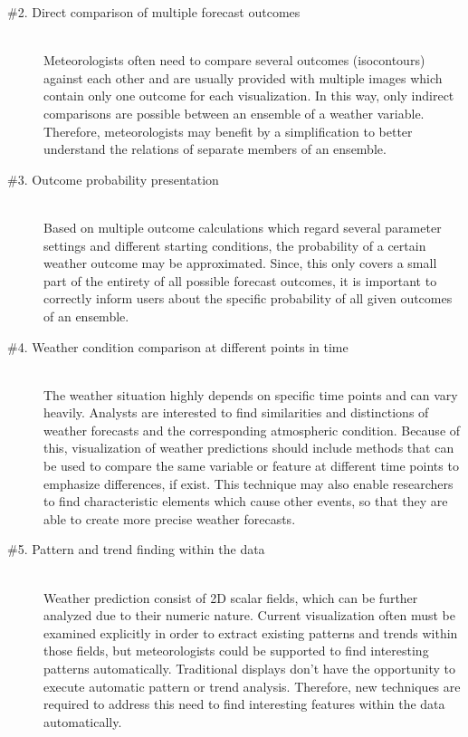\documentclass[citeauthoryear]{llncs}
\begin{document}
\begin{description}
\item[\#2. Direct comparison of multiple forecast outcomes] \ \\ 
Meteorologists often need to compare several outcomes (isocontours) against each other and are usually provided with multiple images which contain only one outcome for each visualization. In this way, only indirect comparisons are possible between an ensemble of a weather variable. Therefore, meteorologists may benefit by a simplification to better understand the relations of separate members of an ensemble. \\
\item[\#3. Outcome probability presentation] \ \\ 
Based on multiple outcome calculations which regard several parameter settings and different starting conditions, the probability of a certain weather outcome may be approximated. Since, this only covers a small part of the entirety of all possible forecast outcomes, it is important to correctly inform users about the specific probability of all given outcomes of an ensemble. \\
\item[\#4. Weather condition comparison at different points in time] \ \\ 
The weather situation highly depends on specific time points and can vary heavily. Analysts are interested to find similarities and distinctions of weather forecasts and the corresponding atmospheric condition. Because of this, visualization of weather predictions should include methods that can be used to compare the same variable or feature at different time points to emphasize differences, if exist. This technique may also enable researchers to find characteristic elements which cause other events, so that they are able to create more precise weather forecasts. \\
\item[\#5. Pattern and trend finding within the data] \ \\ 
Weather prediction consist of 2D scalar fields, which can be further analyzed due to their numeric nature. Current visualization often must be examined explicitly in order to extract existing patterns and trends within those fields, but meteorologists could be supported to find interesting patterns automatically. Traditional displays don't have the opportunity to execute automatic pattern or trend analysis. Therefore, new techniques are required to address this need to find interesting features within the data automatically.\\

\end{description}
\end{document}
